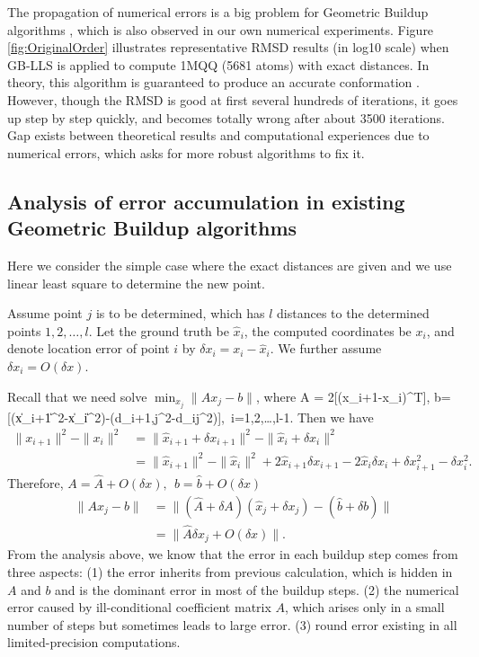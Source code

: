 \documentclass[a4paper,12pt]{article}
\begin{document}
The propagation of numerical errors is a big problem for Geometric Buildup algorithms \cite{Wu2006,Wu2008}, which is also observed in our own numerical experiments. Figure \ref{fig:OriginalOrder} illustrates representative RMSD results (in log10 scale) when GB-LLS is applied to compute 1MQQ (5681 atoms) with exact distances. In theory, this algorithm is guaranteed to produce an accurate conformation \cite{Sit2009}. However, though the RMSD is good at first several hundreds of iterations, it goes up step by step quickly, and becomes totally wrong after about 3500 iterations. Gap exists between theoretical results and computational experiences due to numerical errors, which asks for more robust algorithms to fix it.

\subsection{Analysis of error accumulation in existing Geometric Buildup algorithms}
Here we consider the simple case where the exact distances are given and we use linear least square to determine the new point.

Assume point $j$ is to be determined, which has $l$ distances to the determined points $1,2,\ldots,l$. Let the ground truth be $\widehat{x}_i$, the computed coordinates be $x_i$, and denote location error of point $i$ by $\delta x_i=x_i-\widehat{x}_i$. We further assume $\delta x_i=O(\delta x)$.

Recall that we need solve $\min_{x_j} \|Ax_j-b\|$, where
\be A = 2[(x_{i+1}-x_i)^T], b=[(\|x_{i+1}\|^2-\|x_i\|^2)-(d_{i+1,j}^2-d_{ij}^2)],~i=1,2,\ldots,l-1.\ee
Then we have
\begin{align}
  \|x_{i+1}\|^2-\|x_i\|^2 & = \|\widehat{x}_{i+1}+\delta x_{i+1}\|^2-\|\widehat{x}_i+\delta x_i\|^2    \\
   & = \|\widehat{x}_{i+1}\|^2-\|\widehat{x}_i\|^2 + 2\widehat{x}_{i+1}\delta x_{i+1} - 2\widehat{x}_i\delta x_i + \delta x_{i+1}^2-\delta x_i^2.
\end{align}
Therefore, $A=\widehat{A}+O(\delta x),~~b=\widehat{b}+O(\delta x)$
\begin{align}
  \|Ax_j-b\| & =\|(\widehat{A}+\delta A)(\widehat{x}_j+\delta x_j)-(\widehat{b} + \delta b)\| \\
   & =\|\widehat{A} \delta x_j + O(\delta x)\|.
\end{align}
From the analysis above, we know that the error in each buildup step comes from three aspects: (1) the error inherits from previous calculation, which is hidden in $A$ and $b$ and is the dominant error in most of the buildup steps. (2) the numerical error caused by ill-conditional coefficient matrix $A$, which arises only in a small number of steps but sometimes leads to large error. (3) round error existing in all limited-precision computations.
\end{document}
